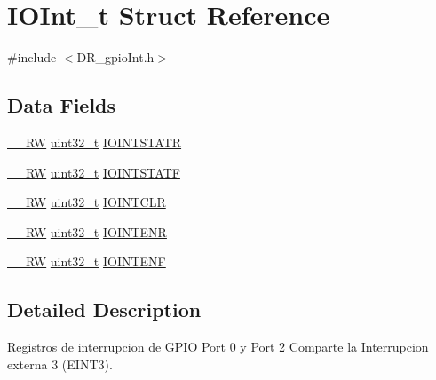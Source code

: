 \hypertarget{struct_i_o_int__t}{}\section{I\+O\+Int\+\_\+t Struct Reference}
\label{struct_i_o_int__t}


{\ttfamily \#include $<$D\+R\+\_\+gpio\+Int.\+h$>$}

\subsection*{Data Fields}
\begin{DoxyCompactItemize}
\item 
\mbox{\hyperlink{_d_r__tipos_8h_a81f369079976a46554fd9798ab035697}{\+\_\+\+\_\+\+RW}} \mbox{\hyperlink{_d_r__tipos_8h_a435d1572bf3f880d55459d9805097f62}{uint32\+\_\+t}} \mbox{\hyperlink{struct_i_o_int__t_a63882d661630553c94d27113657ed420}{I\+O\+I\+N\+T\+S\+T\+A\+TR}}
\item 
\mbox{\hyperlink{_d_r__tipos_8h_a81f369079976a46554fd9798ab035697}{\+\_\+\+\_\+\+RW}} \mbox{\hyperlink{_d_r__tipos_8h_a435d1572bf3f880d55459d9805097f62}{uint32\+\_\+t}} \mbox{\hyperlink{struct_i_o_int__t_afbf68076b67b0d358ecc2342115d9683}{I\+O\+I\+N\+T\+S\+T\+A\+TF}}
\item 
\mbox{\hyperlink{_d_r__tipos_8h_a81f369079976a46554fd9798ab035697}{\+\_\+\+\_\+\+RW}} \mbox{\hyperlink{_d_r__tipos_8h_a435d1572bf3f880d55459d9805097f62}{uint32\+\_\+t}} \mbox{\hyperlink{struct_i_o_int__t_a87adff8c174430dbab8abef6a47f9996}{I\+O\+I\+N\+T\+C\+LR}}
\item 
\mbox{\hyperlink{_d_r__tipos_8h_a81f369079976a46554fd9798ab035697}{\+\_\+\+\_\+\+RW}} \mbox{\hyperlink{_d_r__tipos_8h_a435d1572bf3f880d55459d9805097f62}{uint32\+\_\+t}} \mbox{\hyperlink{struct_i_o_int__t_a9324e5fd584b87239ee9434b10623eb8}{I\+O\+I\+N\+T\+E\+NR}}
\item 
\mbox{\hyperlink{_d_r__tipos_8h_a81f369079976a46554fd9798ab035697}{\+\_\+\+\_\+\+RW}} \mbox{\hyperlink{_d_r__tipos_8h_a435d1572bf3f880d55459d9805097f62}{uint32\+\_\+t}} \mbox{\hyperlink{struct_i_o_int__t_aad549a604c1feac335a25277b6ff5aad}{I\+O\+I\+N\+T\+E\+NF}}
\end{DoxyCompactItemize}


\subsection{Detailed Description}
Registros de interrupcion de G\+P\+IO Port 0 y Port 2 Comparte la Interrupcion externa 3 (E\+I\+N\+T3). 

